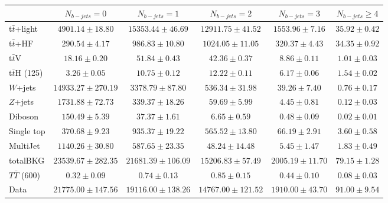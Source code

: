 \begin{tabular}{l c c c c c } \toprule
 & $N_{b-jets}= 0$ & $N_{b-jets}= 1$ & $N_{b-jets}= 2$ & $N_{b-jets}= 3$ & $N_{b-jets}\geq 4$ \\ \midrule 
 t$\bar{t}$+light & $4901.14 \pm 18.80$  & $15353.44 \pm 46.69$  & $12911.75 \pm 41.52$  & $1553.96 \pm 7.16$  & $35.92 \pm 0.42$  \\ 
 t$\bar{t}$+HF & $290.54 \pm 4.17$  & $986.83 \pm 10.80$  & $1024.05 \pm 11.05$  & $320.37 \pm 4.43$  & $34.35 \pm 0.92$  \\ \midrule 
 t$\bar{t}$V & $18.16 \pm 0.20$  & $51.84 \pm 0.43$  & $42.36 \pm 0.37$  & $8.86 \pm 0.11$  & $1.01 \pm 0.03$  \\ 
 t$\bar{t}$H (125) & $3.26 \pm 0.05$  & $10.75 \pm 0.12$  & $12.22 \pm 0.11$  & $6.17 \pm 0.06$  & $1.54 \pm 0.02$  \\ 
 $W$+jets & $14933.27 \pm 270.19$  & $3378.79 \pm 87.80$  & $536.34 \pm 31.98$  & $39.26 \pm 7.40$  & $0.76 \pm 0.17$  \\ 
 $Z$+jets & $1731.88 \pm 72.73$  & $339.37 \pm 18.26$  & $59.69 \pm 5.99$  & $4.45 \pm 0.81$  & $0.12 \pm 0.03$  \\ 
 Diboson & $150.49 \pm 5.39$  & $37.37 \pm 1.61$  & $6.65 \pm 0.59$  & $0.48 \pm 0.09$  & $0.02 \pm 0.01$  \\ 
 Single top & $370.68 \pm 9.23$  & $935.37 \pm 19.22$  & $565.52 \pm 13.80$  & $66.19 \pm 2.91$  & $3.60 \pm 0.58$  \\ 
 MultiJet & $1140.26 \pm 30.80$  & $587.65 \pm 23.35$  & $48.24 \pm 14.48$  & $5.45 \pm 1.47$  & $1.83 \pm 0.49$  \\ \midrule 
 totalBKG & $23539.67 \pm 282.35$  & $21681.39 \pm 106.09$  & $15206.83 \pm 57.49$  & $2005.19 \pm 11.70$  & $79.15 \pm 1.28$  \\ \midrule 
 $T\bar{T}$ (600) & $0.32 \pm 0.09$  & $0.74 \pm 0.13$  & $0.85 \pm 0.15$  & $0.44 \pm 0.10$  & $0.08 \pm 0.03$  \\ \midrule 
 Data & $21775.00 \pm 147.56$  & $19116.00 \pm 138.26$  & $14767.00 \pm 121.52$  & $1910.00 \pm 43.70$  & $91.00 \pm 9.54$  \\ 
 \bottomrule\end{tabular}